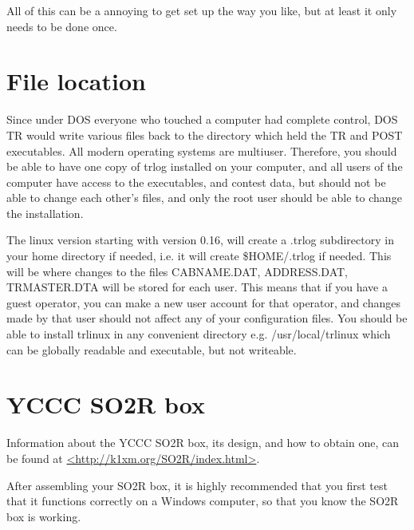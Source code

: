 \documentclass[12pt]{article}
\begin{document}
All of this can be a annoying to get set up the way you like, but at
least it only needs to be done once.

\section{File location}
Since under DOS everyone who touched a computer had complete control, DOS
TR would write various files back to the directory which held the TR and POST
executables. All modern operating systems are multiuser. Therefore,
you should be able to have one copy of trlog installed on your computer,
and all users of the computer have access to the executables, and contest
data, but should not be able to change each other's files, and only
the root user should be able to change the installation.

The linux version starting with version 0.16, will create a .trlog subdirectory
in your home directory if needed, i.e. it will create \$HOME/.trlog if
needed. This will be where changes to
the files CABNAME.DAT, ADDRESS.DAT, TRMASTER.DTA will be stored for each
user. This means that if you have a guest operator, you can make a new
user account for that operator, and changes made by that user should not
affect any of your configuration files. You should be able to install
trlinux in any convenient directory e.g. /usr/local/trlinux which
can be globally readable and executable, but not writeable.

\section{YCCC SO2R box}
Information about the YCCC SO2R box,
its design, and how to obtain
one, can be found at
\url{<http://k1xm.org/SO2R/index.html>}.

After assembling your SO2R box, it is highly recommended that you first
test that it functions correctly on a Windows computer, so that you
know the SO2R box is working.
\end{document}
